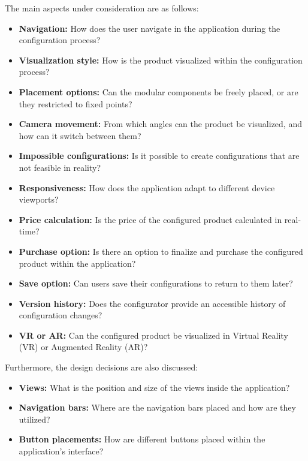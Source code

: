 \pagebreak
\noindent The main aspects under consideration are as follows:\nopagebreak
\begin{itemize}
    \item \textbf{Navigation:} How does the user navigate in the application during the configuration process?
    \item \textbf{Visualization style:} How is the product visualized within the configuration process?
    \item \textbf{Placement options:} Can the modular components be freely placed, or are they restricted to fixed points?
    \item \textbf{Camera movement:} From which angles can the product be visualized, and how can it switch between them?
    \item \textbf{Impossible configurations:} Is it possible to create configurations that are not feasible in reality?
    \item \textbf{Responsiveness:} How does the application adapt to different device viewports?
    \item \textbf{Price calculation:} Is the price of the configured product calculated in real-time?
    \item \textbf{Purchase option:} Is there an option to finalize and purchase the configured product within the application?
    \item \textbf{Save option:} Can users save their configurations to return to them later?
    \item \textbf{Version history:} Does the configurator provide an accessible history of configuration changes?
    \item \textbf{VR or AR:} Can the configured product be visualized in Virtual Reality (VR) or Augmented Reality (AR)?
\end{itemize}

\noindent Furthermore, the design decisions are also discussed:\nopagebreak
\begin{itemize}
    \item \textbf{Views:} What is the position and size of the views inside the application?
    \item \textbf{Navigation bars:} Where are the navigation bars placed and how are they utilized?
    \item \textbf{Button placements:} How are different buttons placed within the application's interface?
\end{itemize}


